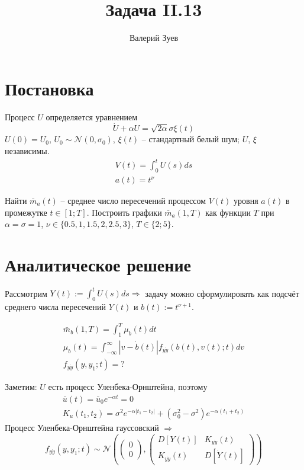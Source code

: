 \documentclass[a4paper,14pt]{extarticle}
\begin{document}
\title{Задача II.13}
\author{Валерий Зуев}
\maketitle

\section{Постановка}

\newcommand{\al}{\alpha}
\newcommand{\g}{\gamma}
\newcommand{\s}{\sigma}
\newcommand{\z}{\zeta}

Процесс $U$ определяется уравнением
\[ \dot U + \al U = \sqrt{2\al} \s \xi(t) \]
$U(0)=U_0$, $U_0 \sim \mathcal{N}(0,\s_0)$, $\xi(t)$ -- стандартный белый шум; $U$, $\xi$ независимы.
\begin{gather*}
    V(t) = \int_0^t U(s)ds \\
    a(t) = t^\nu
\end{gather*}

Найти $\bar m_a(t)$ -- среднее число пересечений процессом $V(t)$ уровня $a(t)$ в промежутке $ t \in [1;T] $.
Построить графики $\bar m_a(1,T)$ как функции $T$ при $\al=\s=1$, $ \nu \in \{ 0.5, 1, 1.5, 2, 2.5, 3 \} $, $T \in \{ 2;5\}$.

\section{Аналитическое решение}

Рассмотрим $ Y(t) := \int_0^t U(s)ds \Rightarrow $ задачу можно сформулировать как подсчёт среднего числа пересечений $Y(t)$ и $b(t) := t^{\nu+1}$.

\begin{gather*}
    \bar m_b(1,T) = \int_1^T \mu_b(t) dt \\
    \mu_b(t) = \int_{-\infty}^\infty |v-\dot b(t)| f_{y \dot y} (b(t),v(t);t) dv \\
    f_{y \dot y}(y,y_1;t) = ?
\end{gather*}

Заметим: $U$ есть процесс Уленбека-Орнштейна, поэтому
\begin{gather*}
    \bar u(t) = \bar u_0 e^{-\al t} = 0 \\
    K_u(t_1,t_2) = \s^2 e^{-\al |t_1-t_2|} +(\s_0^2-\s^2)e^{-\al(t_1+t_2)}
\end{gather*}
Процесс Уленбека-Орнштейна гауссовский $\Rightarrow$
\[ f_{y \dot y}(y,y_1;t) \sim \mathcal{N}\left( \begin{pmatrix}
    0 \\ 0
\end{pmatrix},
\begin{pmatrix}
    D[Y(t)] & K_{y \dot y}(t) \\
    K_{y \dot y}(t) & D[\dot Y(t)]
\end{pmatrix} \right) \]
\end{document}

